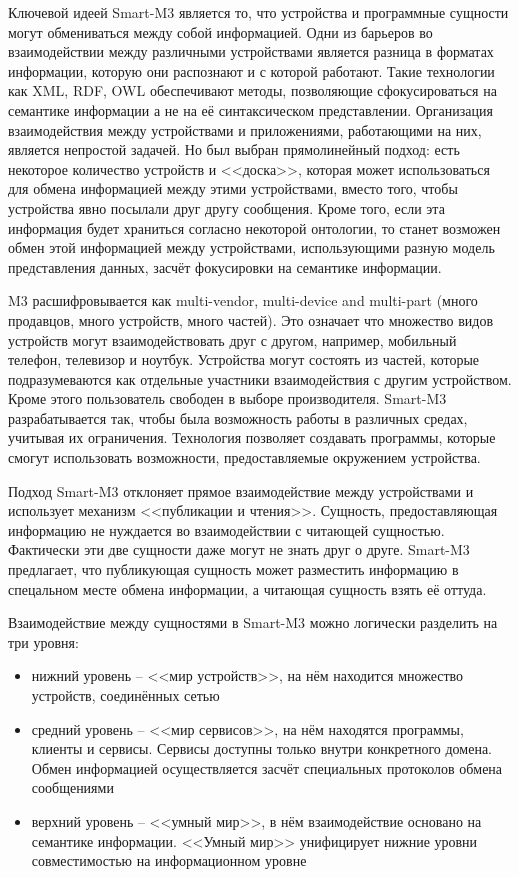 Ключевой идеей Smart-M3 является то, что устройства и программные сущности могут обмениваться между собой информацией.
Одни из барьеров во взаимодействии между различными устройствами является разница в форматах информации, которую они распознают и с которой работают. Такие технологии как XML, RDF, OWL обеспечивают методы, позволяющие сфокусироваться на семантике информации а не на её синтаксическом представлении. Организация взаимодействия между устройствами и приложениями, работающими на них, является непростой задачей. Но был выбран прямолинейный подход: есть некоторое количество устройств и <<доска>>, которая может использоваться для обмена информацией между этими устройствами, вместо того, чтобы устройства явно посылали друг другу сообщения. Кроме того, если эта информация будет храниться согласно некоторой онтологии, то станет возможен обмен этой информацией между устройствами, использующими разную модель представления данных, засчёт фокусировки на семантике информации.

M3 расшифровывается как multi-vendor, multi-device and multi-part (много продавцов, много устройств, много частей).
Это означает что множество видов устройств могут взаимодействовать друг с другом, например, мобильный телефон, телевизор и ноутбук. Устройства могут состоять из частей, которые подразумеваются как отдельные участники взаимодействия с другим устройством. Кроме этого пользователь свободен в выборе производителя. Smart-M3 разрабатывается так, чтобы была возможность работы в различных средах, учитывая их ограничения. Технология позволяет создавать программы, которые смогут использовать возможности, предоставляемые окружением устройства.

Подход Smart-M3 отклоняет прямое взаимодействие между устройствами и использует механизм <<публикации и чтения>>. Сущность, предоставляющая информацию не нуждается во взаимодействии с читающей сущностью. Фактически эти две сущности даже могут не знать друг о друге. Smart-M3 предлагает, что публикующая сущность может разместить информацию в спецальном месте обмена информации, а читающая сущность взять её оттуда.

Взаимодействие между сущностями в Smart-M3 можно логически разделить на три уровня:

\begin{itemize}
\item
нижний уровень -- <<мир устройств>>, на нём находится множество устройств, соединённых сетью
\item
средний уровень -- <<мир сервисов>>, на нём находятся программы, клиенты и сервисы. Сервисы доступны только внутри конкретного домена. Обмен информацией осуществляется засчёт специальных протоколов обмена сообщениями
\item
верхний уровень -- <<умный мир>>, в нём взаимодействие основано на семантике информации. <<Умный мир>> унифицирует нижние уровни совместимостью на информационном уровне
\end{itemize}

